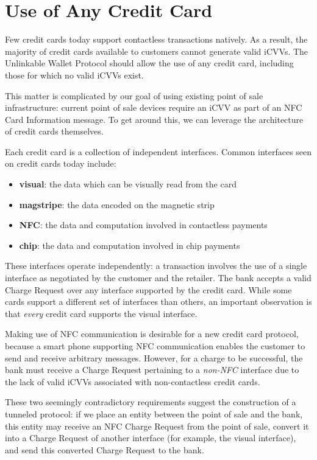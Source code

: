 \section{Use of Any Credit Card}
\label{sec:goals-anycard}

Few credit cards today support contactless transactions natively.
As a result, the majority of credit cards available to customers cannot generate valid iCVVs.
The Unlinkable Wallet Protocol should allow the use of any credit card, including those for which no valid iCVVs exist.

This matter is complicated by our goal of using existing point of sale infrastructure:
    current point of sale devices require an iCVV as part of an NFC Card Information message.
To get around this, we can leverage the architecture of credit cards themselves.

Each credit card is a collection of independent interfaces.
Common interfaces seen on credit cards today include:

\begin{itemize}
\item \textbf{visual}: the data which can be visually read from the card
\item \textbf{magstripe}: the data encoded on the magnetic strip
\item \textbf{NFC}: the data and computation involved in contactless payments
\item \textbf{chip}: the data and computation involved in chip payments
\end{itemize}

These interfaces operate independently:
    a transaction involves the use of a single interface as negotiated by the customer and the retailer.
The bank accepts a valid Charge Request over any interface supported by the credit card.
While some cards support a different set of interfaces than others, an important observation is that \emph{every} credit card supports the visual interface.

Making use of NFC communication is desirable for a new credit card protocol,
    because a smart phone supporting NFC communication enables the customer to send and receive arbitrary messages.
However, for a charge to be successful, the bank must receive a Charge Request pertaining to a \emph{non-NFC} interface due to the lack of valid iCVVs associated with non-contactless credit cards.

These two seemingly contradictory requirements suggest the construction of a tunneled protocol:
    if we place an entity between the point of sale and the bank, this entity may receive an NFC Charge Request from the point of sale,
    convert it into a Charge Request of another interface (for example, the visual interface),
    and send this converted Charge Request to the bank.

